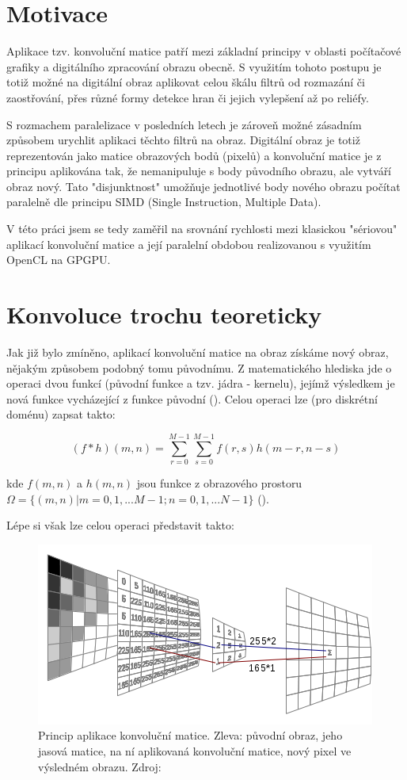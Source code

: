 \documentclass[10pt,a4paper]{article}
\begin{document}
\section{Motivace}

Aplikace tzv. konvoluční matice patří mezi základní principy v oblasti počítačové grafiky a digitálního zpracování obrazu obecně. S využitím tohoto postupu je totiž možné na digitální obraz aplikovat celou škálu filtrů od rozmazání či zaostřování, přes různé formy detekce hran či jejich vylepšení až po reliéfy.

S rozmachem paralelizace v posledních letech je zároveň možné zásadním způsobem urychlit aplikaci těchto filtrů na obraz. Digitální obraz je totiž reprezentován jako matice obrazových bodů (pixelů) a konvoluční matice je z principu aplikována tak, že nemanipuluje s body původního obrazu, ale vytváří obraz nový. Tato "disjunktnost" umožňuje jednotlivé body nového obrazu počítat paralelně dle principu SIMD (Single Instruction, Multiple Data).

V této práci jsem se tedy zaměřil na srovnání rychlosti mezi klasickou "sériovou" aplikací konvoluční matice a její paralelní obdobou realizovanou s využitím OpenCL na GPGPU.

\section{Konvoluce trochu teoreticky}

Jak již bylo zmíněno, aplikací konvoluční matice na obraz získáme nový obraz, nějakým způsobem podobný tomu původnímu. Z matematického hlediska jde o operaci dvou funkcí (původní funkce a tzv. jádra - kernelu), jejímž výsledkem je nová funkce vycházející z funkce původní (\cite{comtel}). Celou operaci lze (pro diskrétní doménu) zapsat takto:

\label{conv_eq}
\begin{equation}
(f*h)(m,n)=\sum^{M-1}_{r=0}\sum^{M-1}_{s=0}f(r,s)h(m-r,n-s)
\end{equation}

kde $f(m,n)$ a $h(m,n)$ jsou funkce z obrazového prostoru $\Omega=\{(m,n)|m=0,1,...M-1;n=0,1,...N-1\}$ (\cite{dzo}).

Lépe si však lze celou operaci představit takto:

\begin{figure}[H]
\centering
\includegraphics[scale=1.0]{images/convolution.png}
\caption{Princip aplikace konvoluční matice. Zleva: původní obraz, jeho jasová matice, na ní aplikovaná konvoluční matice, nový pixel ve výsledném obrazu. Zdroj: \cite{comtel}} 
\label{convolution}
\end{figure}
\end{document}
